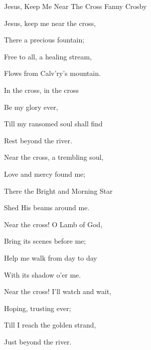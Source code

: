 \documentclass[12pt]{book}
\begin{document}
\begin{song}{Jesus, Keep Me Near The Cross}{}
  {\SBPubDom}
  {Fanny Crosby}
  {}
  {}

  \begin{SBVerse}
    Jesus, keep me near the cross,

    There a precious fountain;

    Free to all, a healing stream,

    Flows from Calv'ry's mountain.
  \end{SBVerse}

  \begin{SBOpGroup}
    In the cross, in the cross

    Be my glory ever,

    Till my ransomed soul shall find

    Rest beyond the river.
  \end{SBOpGroup}

  \begin{SBVerse}
    Near the cross, a trembling soul,

    Love and mercy found me;

    There the Bright and Morning Star

    Shed His beams around me.
  \end{SBVerse}

  \begin{SBVerse}
    Near the cross! O Lamb of God,

    Bring its scenes before me;

    Help me walk from day to day

    With its shadow o'er me.
  \end{SBVerse}

  \begin{SBVerse}
    Near the cross! I'll watch and wait,

    Hoping, trusting ever;

    Till I reach the golden strand,

    Just beyond the river.
  \end{SBVerse}
\end{song}
\end{document}

